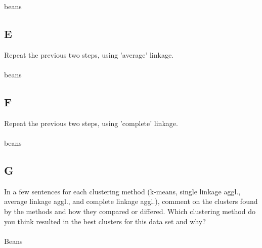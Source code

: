 \documentclass[12pt]{article}
\begin{document}
beans


\subsection{E}
Repeat the previous two steps, using 'average' linkage.\\\\
beans



\subsection{F}
Repeat the previous two steps, using 'complete' linkage.\\\\
beans



\subsection{G}
In a few sentences for each clustering method (k-means, single linkage aggl., average linkage aggl., and complete linkage aggl.), comment on the clusters found by the methods and how they compared or differed. Which clustering method do you think resulted in the best clusters for this data set and why?\\\\

Beans

\end{document}
